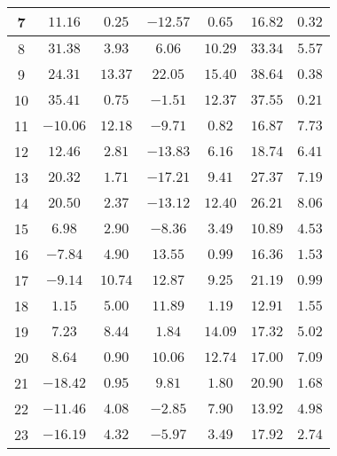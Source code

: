 \begin{table}[H]
\begin{tabular}{|c|c|c|c|c|c|c|}
                        7   &   $11.16$    &  $0.25$   &  $-12.57$  &   $0.65$   &  $16.82$  &  $0.32$  \\ \hline
                        8   &   $31.38$    &  $3.93$   &  $6.06$    &   $10.29$  &  $33.34$  &  $5.57$  \\ \hline
                        9   &   $24.31$    &  $13.37$  &  $22.05$   &   $15.40$  &  $38.64$  &  $0.38$  \\ \hline
                        10  &   $35.41$    &  $0.75$   &  $-1.51$   &   $12.37$  &  $37.55$  &  $0.21$  \\ \hline
                        11  &   $-10.06$   &  $12.18$  &  $-9.71$   &   $0.82$   &  $16.87$  &  $7.73$  \\ \hline
                        12  &   $12.46$    &  $2.81$   &  $-13.83$  &   $6.16$   &  $18.74$  &  $6.41$  \\ \hline
                        13  &   $20.32$    &  $1.71$   &  $-17.21$  &   $9.41$   &  $27.37$  &  $7.19$  \\ \hline
                        14  &   $20.50$    &  $2.37$   &  $-13.12$  &   $12.40$  &  $26.21$  &  $8.06$  \\ \hline
                        15  &   $6.98$     &  $2.90$   &  $-8.36$   &   $3.49$   &  $10.89$  &  $4.53$  \\ \hline
                        16  &   $-7.84$    &  $4.90$   &  $13.55$   &   $0.99$   &  $16.36$  &  $1.53$  \\ \hline
                        17  &   $-9.14$    &  $10.74$  &  $12.87$   &   $9.25$   &  $21.19$  &  $0.99$  \\ \hline
                        18  &   $1.15$     &  $5.00$   &  $11.89$   &   $1.19$   &  $12.91$  &  $1.55$  \\ \hline
                        19  &   $7.23$     &  $8.44$   &  $1.84$    &   $14.09$  &  $17.32$  &  $5.02$  \\ \hline
                        20  &   $8.64$     &  $0.90$   &  $10.06$   &   $12.74$  &  $17.00$  &  $7.09$  \\ \hline
                        21  &   $-18.42$   &  $0.95$   &  $9.81$    &   $1.80$   &  $20.90$  &  $1.68$  \\ \hline
                        22  &   $-11.46$   &  $4.08$   &  $-2.85$   &   $7.90$   &  $13.92$  &  $4.98$  \\ \hline
                        23  &   $-16.19$   &  $4.32$   &  $-5.97$   &   $3.49$   &  $17.92$  &  $2.74$  \\ \hline

\end{tabular}
\end{table}
